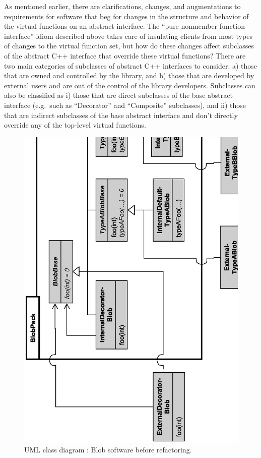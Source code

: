 \documentclass[pdf,ps2pdf,11pt]{SANDreport}
\begin{document}
As mentioned earlier, there are clarifications, changes, and augmentations to
requirements for software that beg for changes in the structure and behavior
of the virtual functions on an abstract interface.  The ``pure nonmember
function interface'' idiom described above takes care of insulating clients
from most types of changes to the virtual function set, but how do these
changes affect subclasses of the abstract C++ interface that override these
virtual functions?  There are two main categories of subclasses of abstract
C++ interfaces to consider: a) those that are owned and controlled by the
library, and b) those that are developed by external users and are out of the
control of the library developers.  Subclasses can also be classified as i)
those that are direct subclasses of the base abstract interface (e.g.\ such as
``Decorator'' and ``Composite'' subclasses), and ii) those that are indirect
subclasses of the base abstract interface and don't directly override any of
the top-level virtual functions.

{\bsinglespace
\begin{figure}
\begin{center}
\includegraphics*[angle=270,scale=0.55
]{BlobBaseBeforeRefactoring}
\end{center}
\caption{
\label{fig:BlobBaseBeforeRefactoring}
UML class diagram : Blob software before refactoring.  }
\end{figure}
\esinglespace}
\end{document}
